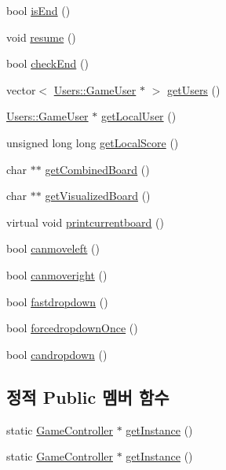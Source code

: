 \begin{DoxyCompactItemize}
\item 
bool \hyperlink{class_tetris_1_1_game_controller_a0fa9ec1dd636ecc916cd4460e14781c4}{is\+End} ()
\item 
void \hyperlink{class_tetris_1_1_game_controller_ab9ff093ea91e3d248a8a287289e758b0}{resume} ()
\item 
bool \hyperlink{class_tetris_1_1_game_controller_ac8058c827eaa393194dcfb83c6964f8a}{check\+End} ()
\item 
vector$<$ \hyperlink{class_tetris_1_1_users_1_1_game_user}{Users\+::\+Game\+User} $\ast$ $>$ \hyperlink{class_tetris_1_1_game_controller_aa3c2d1f1b5539576116833526478355a}{get\+Users} ()
\item 
\hyperlink{class_tetris_1_1_users_1_1_game_user}{Users\+::\+Game\+User} $\ast$ \hyperlink{class_tetris_1_1_game_controller_abc67d4b309ce2886b43a3b4e0af22abc}{get\+Local\+User} ()
\item 
unsigned long long \hyperlink{class_tetris_1_1_game_controller_ad88f3362af23d87282ee8ed39394054d}{get\+Local\+Score} ()
\item 
char $\ast$$\ast$ \hyperlink{class_tetris_1_1_game_controller_a6c22f25017881f6150428b62e4607310}{get\+Combined\+Board} ()
\item 
char $\ast$$\ast$ \hyperlink{class_tetris_1_1_game_controller_aa0d81626f41c784dc256069293719e5f}{get\+Visualized\+Board} ()
\item 
virtual void \hyperlink{class_tetris_1_1_game_controller_a5553ac767c6065148b7c332f59251e76}{printcurrentboard} ()
\item 
bool \hyperlink{class_tetris_1_1_game_controller_ae541cf926ccdce47a185c94a0c80b642}{canmoveleft} ()
\item 
bool \hyperlink{class_tetris_1_1_game_controller_a6c8189bb893502049396a7de1a73a88c}{canmoveright} ()
\item 
bool \hyperlink{class_tetris_1_1_game_controller_a8d5b65ec7638519a39b4ba8a71e67fff}{fastdropdown} ()
\item 
bool \hyperlink{class_tetris_1_1_game_controller_a035e352a85db58a05322156af606f0fa}{forcedropdown\+Once} ()
\item 
bool \hyperlink{class_tetris_1_1_game_controller_ac4993d5ad8640ac617fec341fdb301ee}{candropdown} ()
\end{DoxyCompactItemize}
\subsection*{정적 Public 멤버 함수}
\begin{DoxyCompactItemize}
\item 
static \hyperlink{class_tetris_1_1_game_controller}{Game\+Controller} $\ast$ \hyperlink{class_tetris_1_1_game_controller_af996b3264a1ed606a89be9e72310e569}{get\+Instance} ()
\item 
static \hyperlink{class_tetris_1_1_game_controller}{Game\+Controller} $\ast$ \hyperlink{class_tetris_1_1_game_controller_af996b3264a1ed606a89be9e72310e569}{get\+Instance} ()
\end{DoxyCompactItemize}

